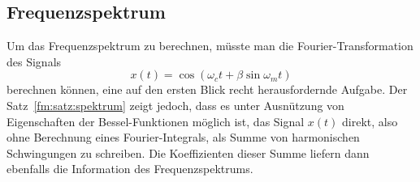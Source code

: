 \subsection{Frequenzspektrum}
Um das Frequenzspektrum zu berechnen, müsste man die Fourier-Transformation
des Signals
\[
x(t)
=
\cos(\omega_c t + \beta\sin\omega_m t)
\]
berechnen können, eine auf den ersten Blick recht herausfordernde
Aufgabe.
Der Satz~\ref{fm:satz:spektrum} zeigt jedoch, dass es unter Ausnützung
von Eigenschaften der Bessel-Funktionen möglich ist, das Signal
$x(t)$ direkt, also ohne Berechnung eines Fourier-Integrals,
als Summe von harmonischen Schwingungen zu schreiben.
Die Koeffizienten dieser Summe liefern dann ebenfalls die Information
des Frequenzspektrums.


